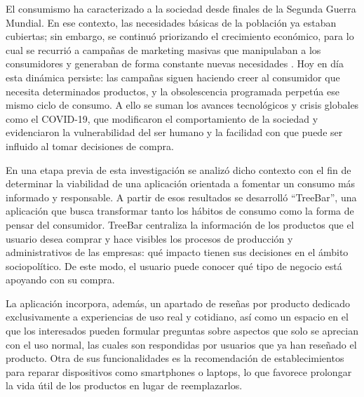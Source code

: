 El consumismo ha caracterizado a la sociedad desde finales de la Segunda
Guerra Mundial. En ese contexto, las necesidades básicas de la población ya
estaban cubiertas; sin embargo, se continuó priorizando el crecimiento
económico, para lo cual se recurrió a campañas de marketing masivas que
manipulaban a los consumidores y generaban de forma constante nuevas
necesidades \parencite[p.~160]{gorostiza2025}. Hoy en día esta dinámica
persiste: las campañas siguen haciendo creer al consumidor que necesita
determinados productos, y la obsolescencia programada perpetúa ese mismo ciclo
de consumo. A ello se suman los avances tecnológicos y crisis globales como el
COVID-19, que modificaron el comportamiento de la sociedad y evidenciaron la
vulnerabilidad del ser humano y la facilidad con que puede ser influido al
tomar decisiones de compra.

En una etapa previa de esta investigación se analizó dicho contexto con el fin
de determinar la viabilidad de una aplicación orientada a fomentar un consumo
más informado y responsable. A partir de esos resultados se desarrolló
``TreeBar'', una aplicación que busca transformar tanto los hábitos de consumo
como la forma de pensar del consumidor. TreeBar centraliza la información de los
productos que el usuario desea comprar y hace visibles los procesos de
producción y administrativos de las empresas: qué impacto tienen sus decisiones
en el ámbito sociopolítico. De este modo, el usuario puede conocer qué tipo de
negocio está apoyando con su compra.

La aplicación incorpora, además, un apartado de reseñas por producto dedicado
exclusivamente a experiencias de uso real y cotidiano, así como un espacio en
el que los interesados pueden formular preguntas sobre aspectos que solo se
aprecian con el uso normal, las cuales son respondidas por usuarios que ya han
reseñado el producto. Otra de sus funcionalidades es la recomendación de
establecimientos para reparar dispositivos como smartphones o laptops, lo que
favorece prolongar la vida útil de los productos en lugar de reemplazarlos.
